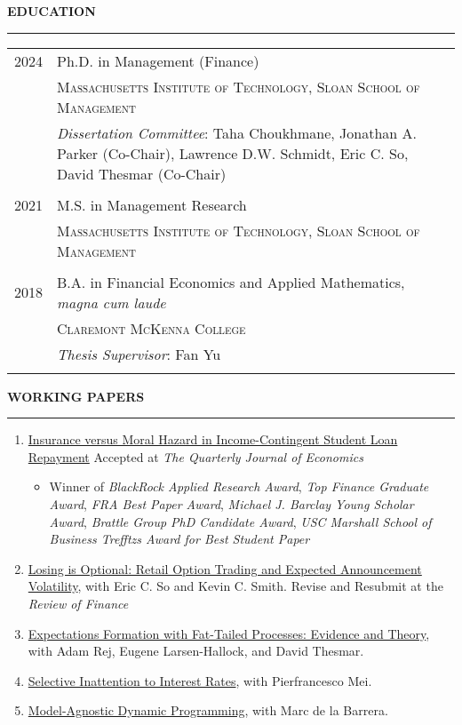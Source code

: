 \documentclass[a4paper, 10pt]{article}
\newcounter{mycounter}
\newcommand{\cvsec}[1]
{
	\needspace{2\baselineskip}
	\noindent \textbf{#1}
	
	\vspace{2pt}
	
	\hrule
	
	\bigskip
}
\newcommand{\cvitem}[2]{#1 & #2 \\ & \\}
\newenvironment{cvchrono}[1]
{
	\cvsec{#1}
	\begin{tabu} to \linewidth {X[1,l]X[6,l]} 
}
{
	\end{tabu}
}
\newenvironment{cvcontinue}[1]
{
	\cvsec{#1}
	\begin{enumerate}
		\setcounter{enumi}{\themycounter}
	}
	{
	\setcounter{mycounter}{\theenumi}
	\end{enumerate}
}
\begin{document}
\begin{cvchrono}{EDUCATION}
	\cvitem{2024}{Ph.D. in Management (Finance) \\
		& \textsc{Massachusetts Institute of Technology, Sloan School of Management} \\
		& \emph{Dissertation Committee}: Taha Choukhmane, Jonathan A. Parker (Co-Chair), Lawrence D.W. Schmidt, Eric C. So, David Thesmar (Co-Chair)
		} 
	\cvitem{2021}{M.S. in Management Research \\
		& \textsc{Massachusetts Institute of Technology, Sloan School of Management}
		} 
	\cvitem{2018}{B.A. in Financial Economics and Applied Mathematics, \emph{magna cum laude} \\
		& \textsc{Claremont McKenna College} \\
		& \emph{Thesis Supervisor}: Fan Yu
		}
\end{cvchrono}

\begin{cvcontinue}{WORKING PAPERS}
	\item \href{https://www.timdesilva.me/files/papers/jmp_deSilva.pdf}{Insurance versus Moral Hazard in Income-Contingent Student Loan Repayment} \newline Accepted at \emph{The Quarterly Journal of Economics}
	\begin{itemize}
		\item Winner of \emph{BlackRock Applied Research Award}, \emph{Top Finance Graduate Award}, \emph{FRA Best Paper Award}, \emph{Michael J. Barclay Young Scholar Award}, \emph{Brattle Group PhD Candidate Award}, \emph{USC Marshall School of Business Trefftzs Award for Best Student Paper}
	\end{itemize}
	\item \href{https://www.timdesilva.me/files/papers/losing_optional.pdf}{Losing is Optional: Retail Option Trading and Expected Announcement Volatility}, with Eric C. So and Kevin C. Smith.  \newline Revise and Resubmit at the \emph{Review of Finance}
	\item \href{https://www.timdesilva.me/files/papers/fat_tails.pdf}{Expectations Formation with Fat-Tailed Processes: Evidence and Theory}, with Adam Rej, Eugene Larsen-Hallock, and David Thesmar.
	\item \href{https://www.timdesilva.me/files/papers/si.pdf}{Selective Inattention to Interest Rates}, with Pierfrancesco Mei.
	\item \href{https://www.timdesilva.me/files/papers/agnostic_dp.pdf}{Model-Agnostic Dynamic Programming}, with Marc de la Barrera.%
\end{cvcontinue}
\end{document}
